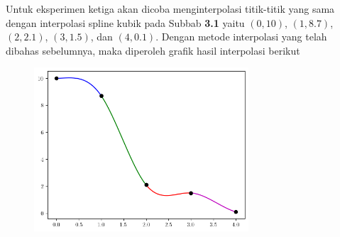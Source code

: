 Untuk eksperimen ketiga akan dicoba menginterpolasi titik-titik yang sama dengan interpolasi spline kubik pada Subbab \textbf{3.1} yaitu $(0,10)$, $(1,8.7)$, $(2,2.1)$, $(3,1.5)$, dan $(4,0.1)$. Dengan metode interpolasi yang telah dibahas sebelumnya, maka diperoleh grafik hasil interpolasi berikut
\begin{figure}[H]
    \centering
    \includegraphics[width=8cm]{Images/figure_2/grafikS3.png}
\end{figure}

